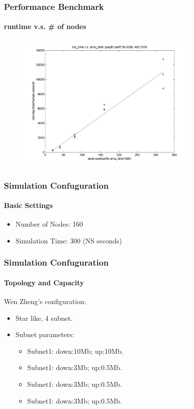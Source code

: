 \documentclass[14pt]{beamer}
\begin{document}
\begin{frame}
\frametitle{Performance Benchmark}
\framesubtitle{runtime v.s. \# of nodes}
\begin{figure}
	\includegraphics[width=0.8\textwidth]{../fig/runtime_vs_simutime.jpg}
\end{figure}
\end{frame}

\begin{frame}
\frametitle{Simulation Confuguration}
\framesubtitle{Basic Settings}
\begin{itemize}
	\item Number of Nodes: 160
	\item Simulation Time: 300 (NS seconds)
\end{itemize}
\end{frame}

\begin{frame}
\frametitle{Simulation Confuguration}
\framesubtitle{Topology and Capacity}
Wen Zheng's configuration:
\begin{itemize}
	\item Star like, 4 subnet. 
	\item Subnet parameters:
		\begin{itemize}
			\item Subnet1: down:10Mb; up:10Mb. 
			\item Subnet1: down:3Mb; up:0.5Mb. 
			\item Subnet1: down:3Mb; up:0.5Mb. 
			\item Subnet1: down:3Mb; up:0.5Mb. 
		\end{itemize}
\end{itemize}
\end{frame}
\end{document}
